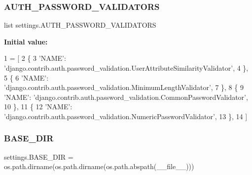 \mbox{\label{namespacesettings_ac66e38ec72cd4e30f8c4b39fde980eb3}} 
\subsubsection{\texorpdfstring{A\+U\+T\+H\+\_\+\+P\+A\+S\+S\+W\+O\+R\+D\+\_\+\+V\+A\+L\+I\+D\+A\+T\+O\+RS}{AUTH\_PASSWORD\_VALIDATORS}}
{\footnotesize\ttfamily list settings.\+A\+U\+T\+H\+\_\+\+P\+A\+S\+S\+W\+O\+R\+D\+\_\+\+V\+A\+L\+I\+D\+A\+T\+O\+RS}

{\bfseries Initial value\+:}
\begin{DoxyCode}
1 =  [
2     \{
3         \textcolor{stringliteral}{'NAME'}: \textcolor{stringliteral}{'django.contrib.auth.password\_validation.UserAttributeSimilarityValidator'},
4     \},
5     \{
6         \textcolor{stringliteral}{'NAME'}: \textcolor{stringliteral}{'django.contrib.auth.password\_validation.MinimumLengthValidator'},
7     \},
8     \{
9         \textcolor{stringliteral}{'NAME'}: \textcolor{stringliteral}{'django.contrib.auth.password\_validation.CommonPasswordValidator'},
10     \},
11     \{
12         \textcolor{stringliteral}{'NAME'}: \textcolor{stringliteral}{'django.contrib.auth.password\_validation.NumericPasswordValidator'},
13     \},
14 ]
\end{DoxyCode}
\mbox{\label{namespacesettings_a9e59ea41f422e65696856676708708e1}} 
\subsubsection{\texorpdfstring{B\+A\+S\+E\+\_\+\+D\+IR}{BASE\_DIR}}
{\footnotesize\ttfamily settings.\+B\+A\+S\+E\+\_\+\+D\+IR = os.\+path.\+dirname(os.\+path.\+dirname(os.\+path.\+abspath(\+\_\+\+\_\+file\+\_\+\+\_\+)))}

\mbox{\label{namespacesettings_a64a31053a37a69ffa2300f5583d75090}} 
